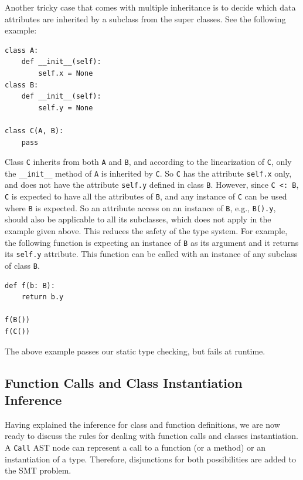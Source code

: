 Another tricky case that comes with multiple inheritance is to decide which data attributes are inherited by a subclass from the super classes. See the following example:

\begin{lstlisting}
class A:
	def __init__(self):
		self.x = None
class B:
	def __init__(self):
		self.y = None

class C(A, B):
	pass
\end{lstlisting}
Class \lstinline|C| inherits from both \lstinline|A| and \lstinline|B|, and according to the linearization of \lstinline|C|, only the \lstinline|__init__| method of \lstinline|A| is inherited by \lstinline|C|. So \lstinline|C| has the attribute \lstinline|self.x| only, and does not have the attribute \lstinline|self.y| defined in class \lstinline|B|. However, since \lstinline|C <: B|, \lstinline|C| is expected to have all the attributes of \lstinline|B|, and any instance of \lstinline|C| can be used where \lstinline|B| is expected. So an attribute access on an instance of \lstinline|B|, e.g., \lstinline|B().y|, should also be applicable to all its subclasses, which does not apply in the example given above. This reduces the safety of the type system. For example, the following function is expecting an instance of \lstinline|B| as its argument and it returns its \lstinline|self.y| attribute. This function can be called with an instance of any subclass of class \lstinline|B|.
\begin{lstlisting}
def f(b: B):
	return b.y
	
f(B())
f(C()) 
\end{lstlisting}

The above example passes our static type checking, but fails at runtime.
\subsection{Function Calls and Class Instantiation Inference}\label{sec:call}
Having explained the inference for class and function definitions, we are now ready to discuss the rules for dealing with function calls and classes instantiation. A \lstinline|Call| AST node can represent a call to a function (or a method) or an instantiation of a type. Therefore, disjunctions for both possibilities are added to the SMT problem.

